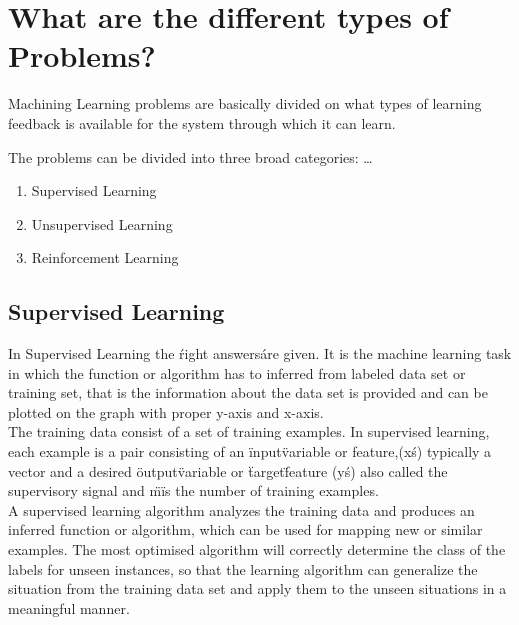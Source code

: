\documentclass[a4paper, 12pt]{article}
\begin{document}
\section{What are the different types of Problems?}

Machining Learning problems are basically divided on what types of learning feedback is available for the system through which it can learn. 

The problems can be divided into three broad categories: \dots

\begin{enumerate}
\item Supervised Learning
\item Unsupervised Learning
\item Reinforcement Learning
\end{enumerate}

\subsection{Supervised Learning}

In Supervised Learning the \'right answers\' are given. It is the machine learning task in which the function or algorithm has to inferred from labeled data set or training set, that is the information about the data set is provided and can be plotted on the graph with proper y-axis and x-axis.\\

The training data consist of a set of training examples. In supervised learning, each example is a pair consisting of an \"input\" variable or feature,(x\'s) typically a vector and a desired \"output\" variable or \"target\" feature (y\'s) also called the supervisory signal and \"m\" is the number of training examples.\\
A supervised learning algorithm analyzes the training data and produces an inferred function or algorithm, which can be used for mapping new or similar examples. The most optimised algorithm will correctly determine the class of the labels for unseen instances, so that the learning algorithm can generalize the situation from the training data set and apply them to the unseen situations in a meaningful manner.
\end{document}
